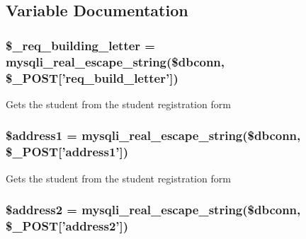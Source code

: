\subsection{\-Variable \-Documentation}
\hypertarget{admin__view_2validate_2studentVal_8php_aa9cc64b4d1f994b0e4e2437b8bb61c96}{
\subsubsection[{\$\-\_\-req\-\_\-building\-\_\-letter}]{\setlength{\rightskip}{0pt plus 5cm}\$\-\_\-req\-\_\-building\-\_\-letter = mysqli\-\_\-real\-\_\-escape\-\_\-string(\$dbconn, \$\-\_\-\-P\-O\-S\-T\mbox{[}'req\-\_\-build\-\_\-letter'\mbox{]})}}\label{admin__view_2validate_2studentVal_8php_aa9cc64b4d1f994b0e4e2437b8bb61c96}
\-Gets the student from the student registration form \hypertarget{admin__view_2validate_2studentVal_8php_a653579f1800dead9ae026af236859831}{
\subsubsection[{\$address1}]{\setlength{\rightskip}{0pt plus 5cm}\$address1 = mysqli\-\_\-real\-\_\-escape\-\_\-string(\$dbconn, \$\-\_\-\-P\-O\-S\-T\mbox{[}'address1'\mbox{]})}}\label{admin__view_2validate_2studentVal_8php_a653579f1800dead9ae026af236859831}
\-Gets the student from the student registration form \hypertarget{admin__view_2validate_2studentVal_8php_a914305af9ec7e49528f07f35a8e8c6a9}{
\subsubsection[{\$address2}]{\setlength{\rightskip}{0pt plus 5cm}\$address2 = mysqli\-\_\-real\-\_\-escape\-\_\-string(\$dbconn, \$\-\_\-\-P\-O\-S\-T\mbox{[}'address2'\mbox{]})}}\label{admin__view_2validate_2studentVal_8php_a914305af9ec7e49528f07f35a8e8c6a9}
